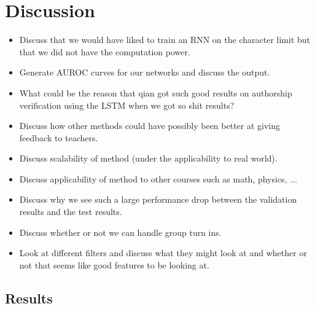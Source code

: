 \section{Discussion} \label{sec:discussion}

\begin{itemize}

    \item

        Discuss that we would have liked to train an RNN on the character limit
        but that we did not have the computation power.

    \item

        Generate AUROC curves for our networks and discuss the output.

    \item

        What could be the reason that qian got such good results on authorship
        verification using the LSTM when we got so shit results?

    \item

        Discuss how other methods could have possibly been better at giving
        feedback to teachers.

    \item

        Discuss scalability of method (under the applicability to real world).

    \item

        Discuss applicability of method to other courses such as math, physics,
        ...

    \item

        Discuss why we see such a large performance drop between the validation
        results and the test results.

    \item

        Discuss whether or not we can handle group turn ins.

    \item

        Look at different filters and discuss what they might look at and
        whether or not that seems like good features to be looking at.

\end{itemize}


\subsection{Results}

